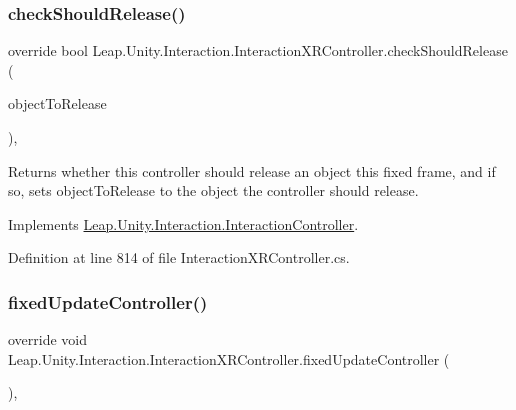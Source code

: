 \subsubsection{\texorpdfstring{checkShouldRelease()}{checkShouldRelease()}}
{\footnotesize\ttfamily override bool Leap.\+Unity.\+Interaction.\+Interaction\+X\+R\+Controller.\+check\+Should\+Release (\begin{DoxyParamCaption}\item[{out \mbox{\hyperlink{interface_leap_1_1_unity_1_1_interaction_1_1_i_interaction_behaviour}{I\+Interaction\+Behaviour}}}]{object\+To\+Release }\end{DoxyParamCaption})\hspace{0.3cm}{\ttfamily [protected]}, {\ttfamily [virtual]}}



Returns whether this controller should release an object this fixed frame, and if so, sets object\+To\+Release to the object the controller should release. 



Implements \mbox{\hyperlink{class_leap_1_1_unity_1_1_interaction_1_1_interaction_controller_ac2f99423db66dad0d889723c6acff62f}{Leap.\+Unity.\+Interaction.\+Interaction\+Controller}}.



Definition at line 814 of file Interaction\+X\+R\+Controller.\+cs.

\mbox{\label{class_leap_1_1_unity_1_1_interaction_1_1_interaction_x_r_controller_aa7e13f419009b2f0fd02018cc96f81b4}} 
\subsubsection{\texorpdfstring{fixedUpdateController()}{fixedUpdateController()}}
{\footnotesize\ttfamily override void Leap.\+Unity.\+Interaction.\+Interaction\+X\+R\+Controller.\+fixed\+Update\+Controller (\begin{DoxyParamCaption}{ }\end{DoxyParamCaption})\hspace{0.3cm}{\ttfamily [protected]}, {\ttfamily [virtual]}}



